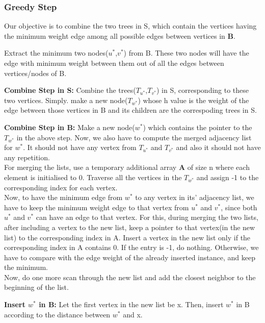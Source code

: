 \documentclass{article}
\begin{document}
\subsubsection{Greedy Step}
Our objective is to combine the two trees in S, which contain the vertices having the minimum weight edge among all possible edges between vertices in \textbf{B}. \\
\par Extract the minimum two nodes($u^*$,$v^*$) from B. These two nodes will have the edge with minimum weight between them out of all the edges between vertices/nodes of B.\\
\par \textbf{Combine Step in S: }Combine the trees($T_{u^*}$,$T_{v^*}$) in S, corresponding to these two vertices. Simply. make a new node($T_{w^*}$) whose h value is the weight of the edge between those vertices in B and its children are the correspoding trees in S.\\
\par \textbf{Combine Step in B: }Make a new node($w^*$) which contains the pointer to the $T_{w^*}$ in the above step. Now, we also have to compute the merged adjacency list for $w^*$. It should not have any vertex from $T_{u^*}$ and $T_{v^*}$ and also it should not have any repetition. \\

For merging the lists, use a temporary additional array \textbf{A} of size n where each element is initialised to 0. Traverse all the vertices in the $T_{w^*}$ and assign -1 to the corresponding index for each vertex. \\

Now, to have the minimum edge from $w^*$ to any vertex in its' adjacency list, we have to keep the minimum weight edge to that vertex from $u^*$ and $v^*$, since both $u^*$ and $v^*$ can have an edge to that vertex. For this, during merging the two lists, after including a vertex to the new list, keep a pointer to that vertex(in the new list) to the corresponding index in A. Insert a vertex in the new list only if the corresponding index in A contains 0. If the entry is -1, do nothing. Otherwise, we have to compare with the edge weight of the already inserted instance, and keep the minimum.\\

Now, do one more scan through the new list and add the closest neighbor to the beginning of the list.

\textbf{Insert $w^*$ in B: }Let the first vertex in the new list be x. Then, insert $w^*$ in B according to the distance between $w^*$ and x.\\
\end{document}
